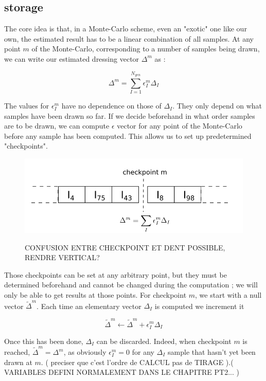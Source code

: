 \documentclass[./thesis.tex]{subfiles}
\begin{document}
\subsection{storage}

The core idea is that, in a Monte-Carlo scheme, even an "exotic" one like our own, the estimated result has to be a linear combination of all samples. At any point $m$ of the Monte-Carlo, corresponding to a number of samples being drawn, we can write our estimated dressing vector $\Delta^m$ as :

$$\Delta^m = \sum_{I=1}^{N_{gen}} \epsilon^m_{I} \Delta_I$$

The values for $\epsilon^m_I$ have no dependence on those of $\Delta_I$. They only depend on what samples have been drawn so far. If we decide beforehand in what order samples are to be drawn, we can compute $\epsilon$ vector for any point of the Monte-Carlo before any sample has been computed. This allows us to set up predetermined "checkpoints".

\begin{figure}[h!]
	\begin{center}
		\includegraphics[width=1.00\columnwidth]{figures/matrix_dressing/checkpoint}
		\caption{\label{checkpoint}}
		CONFUSION ENTRE CHECKPOINT ET DENT POSSIBLE, RENDRE VERTICAL?
	\end{center}
\end{figure}


Those checkpoints can be set at any arbitrary point, but they must be determined beforehand and cannot be changed during the computation ; we will only be able to get results at those points.
For checkpoint $m$, we start with a null vector $\tilde \Delta^m$. Each time an elementary vector $\Delta_I$ is computed
we increment it 


$$\tilde \Delta^m \gets \tilde \Delta^m + \epsilon_I^m \Delta_I$$

Once this has been done, $\Delta_I$ can be discarded. Indeed, when checkpoint $m$ is reached, $\tilde \Delta^m = \Delta^m$, as obviously $\epsilon_I^m = 0$ for any $\Delta_I$ sample that hasn't yet been drawn at $m$. ( preciser que c'est l'ordre de CALCUL pas de TIRAGE ).( VARIABLES DEFINI NORMALEMENT DANS LE CHAPITRE PT2... )
\end{document}
